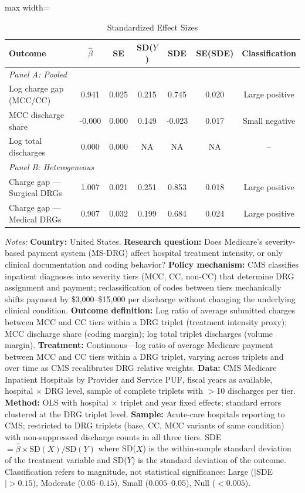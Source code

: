 \begin{table}[htbp]
\centering
\caption{Standardized Effect Sizes}
\label{tab:sde}
\begin{adjustbox}{max width=\textwidth}
\begin{tabular}{lcccccc}
\hline\hline
Outcome & $\hat{\beta}$ & SE & SD($Y$) & SDE & SE(SDE) & Classification \\
\hline
\multicolumn{7}{l}{\textit{Panel A: Pooled}} \\
Log charge gap (MCC/CC) & 0.941 & 0.025 & 0.215 & 0.745 & 0.020 & Large positive \\
MCC discharge share & -0.000 & 0.000 & 0.149 & -0.023 & 0.017 & Small negative \\
Log total discharges & 0.000 & 0.000 & NA & NA & NA & -- \\
\hline
\multicolumn{7}{l}{\textit{Panel B: Heterogeneous}} \\
Charge gap --- Surgical DRGs & 1.007 & 0.021 & 0.251 & 0.853 & 0.018 & Large positive \\
Charge gap --- Medical DRGs & 0.907 & 0.032 & 0.199 & 0.684 & 0.024 & Large positive \\
\hline\hline
\end{tabular}
\end{adjustbox}
\begin{tablenotes}[flushleft]\small
\item \textit{Notes:} \textbf{Country:} United States. \textbf{Research question:} Does Medicare's severity-based payment system (MS-DRG) affect hospital treatment intensity, or only clinical documentation and coding behavior? \textbf{Policy mechanism:} CMS classifies inpatient diagnoses into severity tiers (MCC, CC, non-CC) that determine DRG assignment and payment; reclassification of codes between tiers mechanically shifts payment by \$3,000--\$15,000 per discharge without changing the underlying clinical condition. \textbf{Outcome definition:} Log ratio of average submitted charges between MCC and CC tiers within a DRG triplet (treatment intensity proxy); MCC discharge share (coding margin); log total triplet discharges (volume margin). \textbf{Treatment:} Continuous---log ratio of average Medicare payment between MCC and CC tiers within a DRG triplet, varying across triplets and over time as CMS recalibrates DRG relative weights. \textbf{Data:} CMS Medicare Inpatient Hospitals by Provider and Service PUF, fiscal years as available, hospital $\times$ DRG level, sample of complete triplets with $>$10 discharges per tier. \textbf{Method:} OLS with hospital $\times$ triplet and year fixed effects; standard errors clustered at the DRG triplet level. \textbf{Sample:} Acute-care hospitals reporting to CMS; restricted to DRG triplets (base, CC, MCC variants of same condition) with non-suppressed discharge counts in all three tiers. SDE $= \hat{\beta} \times \text{SD}(X) / \text{SD}(Y)$ where SD($X$) is the within-sample standard deviation of the treatment variable and SD($Y$) is the standard deviation of the outcome. Classification refers to magnitude, not statistical significance: Large ($|$SDE$| > 0.15$), Moderate ($0.05$--$0.15$), Small ($0.005$--$0.05$), Null ($< 0.005$).
\end{tablenotes}
\end{table}

